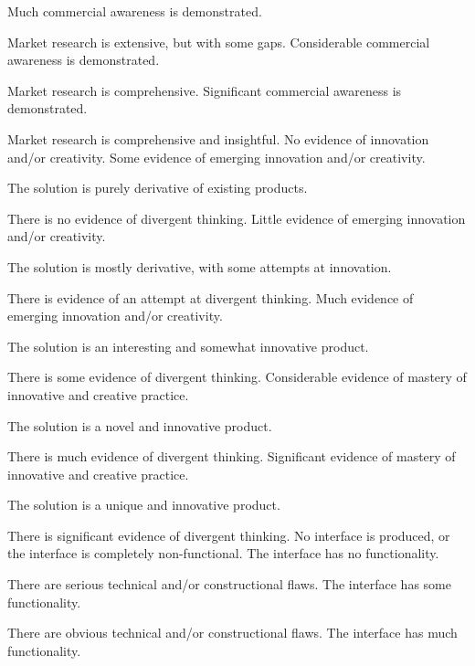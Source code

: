 \documentclass{../fal_assignment}
\begin{document}
\begin{markingrubric}
        \grade Much commercial awareness is demonstrated.
            \par Market research is extensive, but with some gaps.
        \grade Considerable commercial awareness is demonstrated.
            \par Market research is comprehensive.
        \grade Significant commercial awareness is demonstrated.
            \par Market research is comprehensive and insightful.
%
        \grade\fail No evidence of innovation and/or creativity.
        \grade Some evidence of emerging innovation and/or creativity.
            \par The solution is purely derivative of existing products.
            \par There is no evidence of divergent thinking.
        \grade Little evidence of emerging innovation and/or creativity.
            \par The solution is mostly derivative, with some attempts at innovation.
            \par There is evidence of an attempt at divergent thinking.
        \grade Much evidence of emerging innovation and/or creativity.
            \par The solution is an interesting and somewhat innovative product.
            \par There is some evidence of divergent thinking.
        \grade Considerable evidence of mastery of innovative and creative practice.
            \par The solution is a novel and innovative product.
            \par There is much evidence of divergent thinking.
        \grade Significant evidence of mastery of innovative and creative practice.
            \par The solution is a unique and innovative product.
            \par There is significant evidence of divergent thinking.
%            
        \grade\fail No interface is produced, or the interface is completely non-functional.
        \grade The interface has no functionality.
            \par There are serious technical and/or constructional flaws.
        \grade The interface has some functionality.
            \par There are obvious technical and/or constructional flaws.
        \grade The interface has much functionality.

\end{markingrubric}
\end{document}
